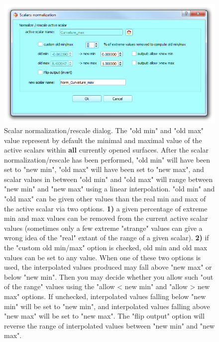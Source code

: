 \begin{figure}
  \centering
  \includegraphics[scale=0.5]{images/11/normalization_dialog.png} 
	\caption{ 
Scalar normalization/rescale dialog. The "old min" and "old max" value represent by default the minimal and maximal value of the active scalars within \textbf{all} currently opened surfaces. After the scalar normalization/rescale has been performed, "old min" will have been set to "new min", "old max" will have been set to "new max", and scalar values in between "old min" and "old max" will range between "new min" and "new max" using a linear interpolation. "old min" and "old max" can be given other values than the real min and max of the active scalar via two options. \textbf{1)} a given percentage of extreme min and max values can be removed from the current active scalar values (sometimes only a few extreme "strange" values can give a wrong idea of the "real" extant of the range of a given scalar). \textbf{2)} if the "custom old min/max" option is checked, old min and old max values can be set to any value.  When one of these two options is used, the interpolated values produced may fall above "new max" or below "new min". Then you may decide whether you allow such "out of the range" values using the "allow < new min" and "allow > new max" options. If unchecked, interpolated values falling below "new min" will be set to "new min", and interpolated values falling above "new max" will be set to "new max". The "flip output" option will reverse the range of interpolated values between "new min" and "new max".
	}
\label{normalization_dialog}
\end{figure}

